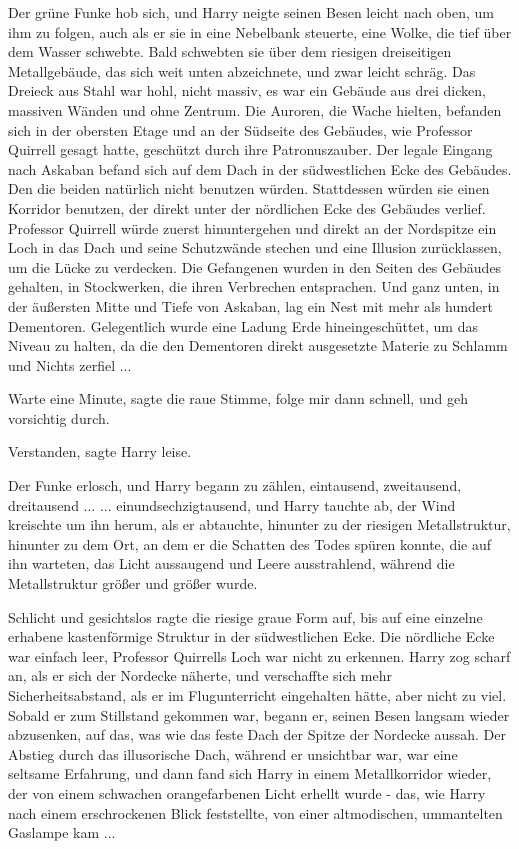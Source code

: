 Der grüne Funke hob sich, und Harry neigte seinen Besen leicht nach oben, um ihm
zu folgen, auch als er sie in eine Nebelbank steuerte, eine Wolke, die tief über
dem Wasser schwebte. Bald schwebten sie über dem riesigen dreiseitigen
Metallgebäude, das sich weit unten abzeichnete, und zwar leicht schräg. Das
Dreieck aus Stahl war hohl, nicht massiv, es war ein Gebäude aus drei dicken,
massiven Wänden und ohne Zentrum. Die Auroren, die Wache hielten, befanden sich
in der obersten Etage und an der Südseite des Gebäudes, wie Professor Quirrell
gesagt hatte, geschützt durch ihre Patronuszauber. Der legale Eingang nach
Askaban befand sich auf dem Dach in der südwestlichen Ecke des Gebäudes. Den die
beiden natürlich nicht benutzen würden. Stattdessen würden sie einen Korridor
benutzen, der direkt unter der nördlichen Ecke des Gebäudes verlief. Professor
Quirrell würde zuerst hinuntergehen und direkt an der Nordspitze ein Loch in das
Dach und seine Schutzwände stechen und eine Illusion zurücklassen, um die Lücke
zu verdecken. Die Gefangenen wurden in den Seiten des Gebäudes gehalten, in
Stockwerken, die ihren Verbrechen entsprachen. Und ganz unten, in der äußersten
Mitte und Tiefe von Askaban, lag ein Nest mit mehr als hundert Dementoren.
Gelegentlich wurde eine Ladung Erde hineingeschüttet, um das Niveau zu halten,
da die den Dementoren direkt ausgesetzte Materie zu Schlamm und Nichts
zerfiel ...

\glqq{}Warte eine Minute\grqq{}, sagte die raue Stimme, \glqq{}folge mir dann
schnell, und geh vorsichtig durch.\grqq{}

\glqq{}Verstanden\grqq{}, sagte Harry leise.

Der Funke erlosch, und Harry begann zu zählen, eintausend, zweitausend,
dreitausend ... ... einundsechzigtausend, und Harry tauchte ab, der Wind
kreischte um ihn herum, als er abtauchte, hinunter zu der riesigen
Metallstruktur, hinunter zu dem Ort, an dem er die Schatten des Todes spüren
konnte, die auf ihn warteten, das Licht aussaugend und Leere ausstrahlend,
während die Metallstruktur größer und größer wurde.

Schlicht und gesichtslos ragte die riesige graue Form auf, bis auf eine einzelne
erhabene kastenförmige Struktur in der südwestlichen Ecke. Die nördliche Ecke
war einfach leer, Professor Quirrells Loch war nicht zu erkennen. Harry zog
scharf an, als er sich der Nordecke näherte, und verschaffte sich mehr
Sicherheitsabstand, als er im Flugunterricht eingehalten hätte, aber nicht zu
viel. Sobald er zum Stillstand gekommen war, begann er, seinen Besen langsam
wieder abzusenken, auf das, was wie das feste Dach der Spitze der Nordecke
aussah. Der Abstieg durch das illusorische Dach, während er unsichtbar war, war
eine seltsame Erfahrung, und dann fand sich Harry in einem Metallkorridor
wieder, der von einem schwachen orangefarbenen Licht erhellt wurde - das, wie
Harry nach einem erschrockenen Blick feststellte, von einer altmodischen,
ummantelten Gaslampe kam ...

